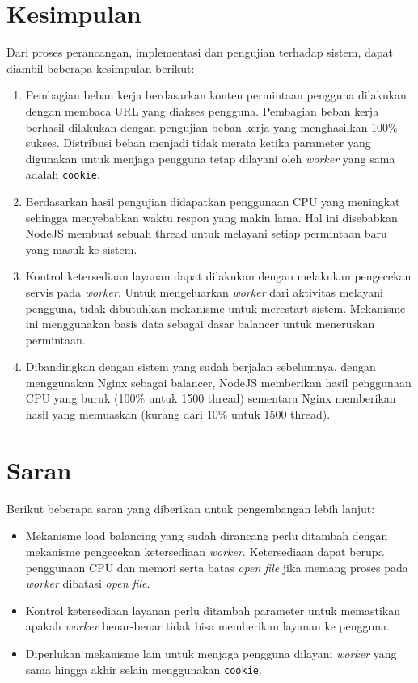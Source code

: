 \documentclass{ta-its}
\begin{document}
			\section{Kesimpulan}
				Dari proses perancangan, implementasi dan pengujian terhadap sistem, dapat diambil beberapa kesimpulan berikut:
				\begin{enumerate}
					\item Pembagian beban kerja berdasarkan konten permintaan pengguna dilakukan dengan membaca URL yang diakses pengguna. Pembagian beban kerja berhasil dilakukan dengan pengujian beban kerja yang menghasilkan 100\% sukses. Distribusi beban menjadi tidak merata ketika parameter yang digunakan untuk menjaga pengguna tetap dilayani oleh \textit{worker} yang sama adalah \texttt{cookie}. 
					\item Berdasarkan hasil pengujian didapatkan penggunaan CPU yang meningkat sehingga menyebabkan waktu respon yang makin lama. Hal ini disebabkan NodeJS membuat sebuah thread untuk melayani setiap permintaan baru yang masuk ke sistem.
					\item Kontrol ketersediaan layanan dapat dilakukan dengan melakukan pengecekan servis pada \textit{worker}. Untuk mengeluarkan \textit{worker} dari aktivitas melayani pengguna, tidak dibutuhkan mekanisme untuk merestart sistem. Mekanisme ini menggunakan basis data sebagai dasar balancer untuk meneruskan permintaan.
					\item Dibandingkan dengan sistem yang sudah berjalan sebelumnya, dengan menggunakan Nginx sebagai balancer, NodeJS memberikan hasil penggunaan CPU yang buruk (100\% untuk 1500 thread) sementara Nginx memberikan hasil yang memuaskan (kurang dari 10\% untuk 1500 thread).
				\end{enumerate}
			
			\section{Saran}
				Berikut beberapa saran yang diberikan untuk pengembangan lebih lanjut:
				\begin{itemize}
					\item Mekanisme load balancing yang sudah dirancang perlu ditambah dengan mekanisme pengecekan ketersediaan \textit{worker}. Ketersediaan dapat berupa penggunaan CPU dan memori serta batas \textit{open file} jika memang proses pada \textit{worker} dibatasi \textit{open file}.
					\item Kontrol ketersediaan layanan perlu ditambah parameter untuk memastikan apakah \textit{worker} benar-benar tidak bisa memberikan layanan ke pengguna.
					\item Diperlukan mekanisme lain untuk menjaga pengguna dilayani \textit{worker} yang sama hingga akhir selain menggunakan \texttt{cookie}.
				\end{itemize}
				
\end{document}
